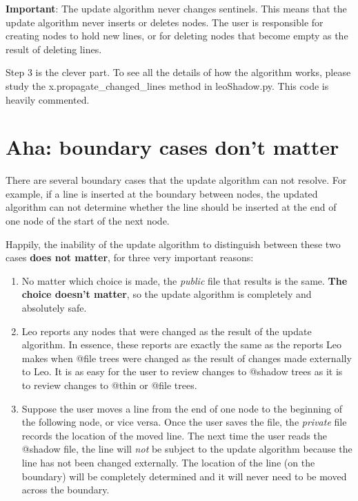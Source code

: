 \documentclass[a4paper,10pt,english]{sphinxmanual}
\begin{document}
\textbf{Important}: The update algorithm never changes sentinels. This means that the
update algorithm never inserts or deletes nodes. The user is responsible for
creating nodes to hold new lines, or for deleting nodes that become empty as the
result of deleting lines.

Step 3 is the clever part. To see all the details of how the algorithm works,
please study the x.propagate\_changed\_lines method in leoShadow.py. This code is
heavily commented.


\section{Aha: boundary cases don't matter}
\label{atShadow:aha-boundary-cases-don-t-matter}
There are several boundary cases that the update algorithm can not resolve.
For example, if a line is inserted at the boundary between nodes,
the updated algorithm can not determine whether the line should be inserted
at the end of one node of the start of the next node.

Happily, the inability of the update algorithm to distinguish between
these two cases \textbf{does not matter}, for three very important reasons:
\begin{enumerate}
\item {} 
No matter which choice is made, the \emph{public} file that results is the same.
\textbf{The choice doesn't matter}, so the update algorithm is completely and
absolutely safe.

\item {} 
Leo reports any nodes that were changed as the result of the update
algorithm. In essence, these reports are exactly the same as the reports Leo
makes when @file trees were changed as the result of changes made externally
to Leo. It is as easy for the user to review changes to @shadow trees as it
is to review changes to @thin or @file trees.

\item {} 
Suppose the user moves a line from the end of one node to the beginning of
the following node, or vice versa. Once the user saves the file, the
\emph{private} file records the location of the moved line. The next time the user
reads the @shadow file, the line will \emph{not} be subject to the update
algorithm because the line has not been changed externally. The location of
the line (on the boundary) will be completely determined and it will never
need to be moved across the boundary.

\end{enumerate}
\end{document}
